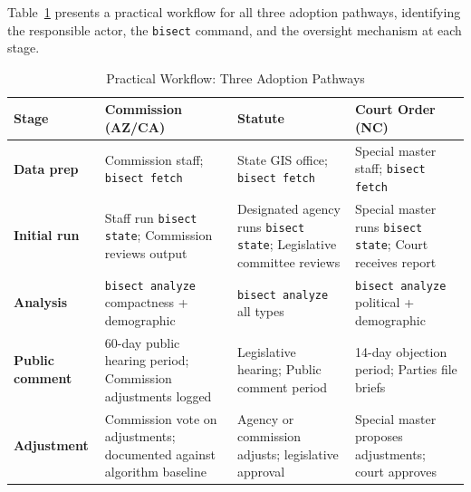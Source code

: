 \label{sec:workflow}

Table~\ref{tab:workflow} presents a practical workflow for all three adoption
pathways, identifying the responsible actor, the \texttt{bisect} command,
and the oversight mechanism at each stage.

\begin{table}[h]
\centering
\caption{Practical Workflow: Three Adoption Pathways}
\label{tab:workflow}
\begin{threeparttable}
\begin{tabular}{p{2cm}p{3.5cm}p{3.5cm}p{3.5cm}}
\toprule
Stage & Commission (AZ/CA) & Statute & Court Order (NC) \\
\midrule
\textbf{Data prep} &
Commission staff; \newline
\texttt{bisect fetch} &
State GIS office; \newline
\texttt{bisect fetch} &
Special master staff; \newline
\texttt{bisect fetch} \\
\addlinespace
\textbf{Initial run} &
Staff run \texttt{bisect state}; \newline
Commission reviews output &
Designated agency runs \texttt{bisect state}; \newline
Legislative committee reviews &
Special master runs \texttt{bisect state}; \newline
Court receives report \\
\addlinespace
\textbf{Analysis} &
\texttt{bisect analyze} \newline compactness + demographic &
\texttt{bisect analyze} \newline all types &
\texttt{bisect analyze} \newline political + demographic \\
\addlinespace
\textbf{Public comment} &
60-day public hearing period; \newline Commission adjustments logged &
Legislative hearing; \newline Public comment period &
14-day objection period; \newline Parties file briefs \\
\addlinespace
\textbf{Adjustment} &
Commission vote on adjustments; \newline documented against algorithm baseline &
Agency or commission adjusts; \newline legislative approval &
Special master proposes adjustments; \newline court approves \\

\end{tabular}
\end{threeparttable}
\end{table}
